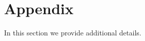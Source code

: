 
\section{Appendix}
\label{append:appendix}



In this section we provide additional details.


















